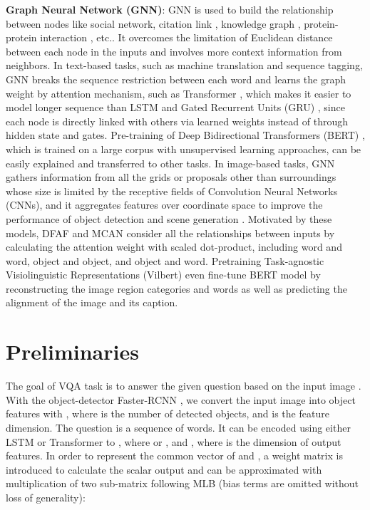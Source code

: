 \documentclass[10pt,twocolumn,letterpaper]{article}
\begin{document}
\textbf{Graph Neural Network (GNN)}: GNN is used to build the relationship between nodes like social network, citation link \cite{hamilton2017inductive}, knowledge graph \cite{kipf2016semi}, protein-protein interaction \cite{velickovic2017graph}, etc.. It overcomes the limitation of Euclidean distance between each node in the inputs and involves more context information from neighbors. In text-based tasks, such as machine translation and sequence tagging, GNN breaks the sequence restriction between each word and learns the graph weight by attention mechanism, such as Transformer \cite{vaswani2017attention}, which makes it easier to model longer sequence than LSTM and Gated Recurrent Units (GRU) \cite{chung2014empirical}, since each node is directly linked with others via learned weights instead of through hidden state and gates. Pre-training of Deep Bidirectional Transformers (BERT) \cite{devlin2018bert}, which is trained on a large corpus with unsupervised learning approaches, can be easily explained and transferred to other tasks. In image-based tasks, GNN gathers information from all the grids \cite{wang2018non, chen2019graph} or proposals \cite{liu2018structure} other than surroundings whose size is limited by the receptive fields of Convolution Neural Networks (CNNs), and it aggregates features over coordinate space to improve the performance of object detection and scene generation \cite{yang2018graph}. Motivated by these models, DFAF \cite{gao2019dynamic} and MCAN \cite{yu2019deep} consider all the relationships between inputs by calculating the attention weight with scaled dot-product, including word and word, object and object, and object and word. Pretraining Task-agnostic Visiolinguistic Representations (Vilbert) \cite{lu2019vilbert} even fine-tune BERT model by reconstructing the image region categories and words as well as predicting the alignment of the image and its caption. 

\section{Preliminaries}
The goal of VQA task is to answer the given question  based on the input image . With the object-detector Faster-RCNN \cite{ren2015faster, anderson2018bottom}, we convert the input image  into object features  with , where  is the number of detected objects, and  is the feature dimension. The question  is a sequence of  words. It can be encoded using either LSTM \cite{hochreiter1997long} or Transformer \cite{vaswani2017attention, devlin2018bert} to , where  or , and , where  is the dimension of output features. In order to represent the common vector of  and , a weight matrix  is introduced to calculate the scalar output  and can be approximated with multiplication of two sub-matrix  following MLB \cite{kim2016hadamard} (bias terms are omitted without loss of generality):
\vspace{-5pt}
\end{document}

